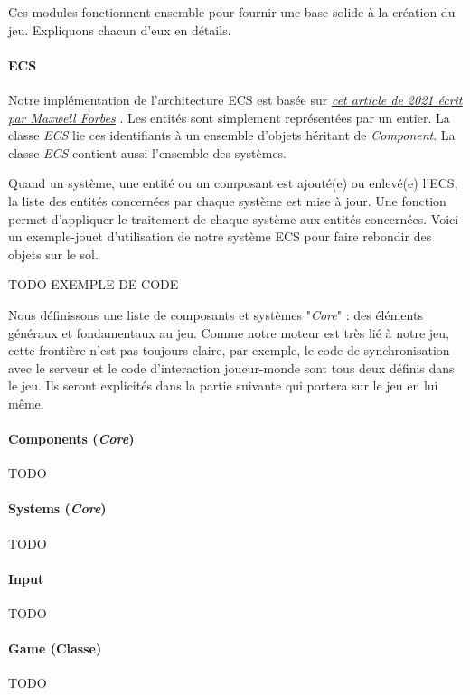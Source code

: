     Ces modules fonctionnent ensemble pour fournir une base solide à la création du jeu. Expliquons chacun d'eux en détails.
\paragraph{ECS}
    Notre implémentation de l'architecture ECS est basée sur \href{https://maxwellforbes.com/posts/typescript-ecs-implementation/}{\textit{cet article de 2021 écrit par Maxwell Forbes}} \cite{forbes2021}. Les entités sont simplement représentées par un entier. La classe \textit{ECS} lie ces identifiants à un ensemble d'objets héritant de \textit{Component}. La classe \textit{ECS} contient aussi l'ensemble des systèmes.
    
    Quand un système, une entité ou un composant est ajouté(e) ou enlevé(e) l'ECS, la liste des entités concernées par chaque système est mise à jour.
    Une fonction permet d'appliquer le traitement de chaque système aux entités concernées. Voici un exemple-jouet d'utilisation de notre système ECS pour faire rebondir des objets sur le sol.

    TODO EXEMPLE DE CODE
    
    Nous définissons une liste de composants et systèmes "\textit{Core}" : des éléments généraux et fondamentaux au jeu. Comme notre moteur est très lié à notre jeu, cette frontière n'est pas toujours claire, par exemple, le code de synchronisation avec le serveur et le code d’interaction joueur-monde sont tous deux définis dans le jeu. Ils seront explicités dans la partie suivante qui portera sur le jeu en lui même.
\paragraph{Components (\textit{Core})}
    TODO


\paragraph{Systems (\textit{Core})}
    TODO




\paragraph{Input}
    TODO
    


\paragraph{Game (Classe)}
    TODO